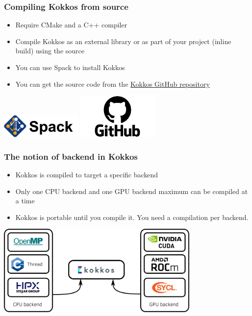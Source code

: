 \documentclass[aspectratio=169]{beamer}
\begin{document}
\begin{frame}
    \frametitle{Compiling Kokkos from source} 
    \begin{itemize}
        \item Require CMake and a C++ compiler
        \item Compile Kokkos as an external library or as part of your project (inline build) using the source
        \item You can use Spack to install Kokkos
        \item You can get the source code from the \href{https://github.com/kokkos/kokkos}{Kokkos GitHub repository}
    \end{itemize}

    \hspace{1cm}

    \centering
    \includegraphics[width=0.3\textwidth]{../../images/spack.png}
    \includegraphics[width=0.3\textwidth]{../../images/GitHub-logo.png}

\end{frame}


\begin{frame}
    \frametitle{The notion of backend in Kokkos} 
    \begin{itemize}
        \item Kokkos is compiled to target a specific backend
        \item Only one CPU backend and one GPU backend maximum can be compiled at a time
        \item Kokkos is portable until you compile it. You need a compilation per backend.
    \end{itemize}

    \hspace{1cm}

    \centering
    \includegraphics[width=0.75\textwidth]{../../images/kokkos_backend.png}

\end{frame}
\end{document}
